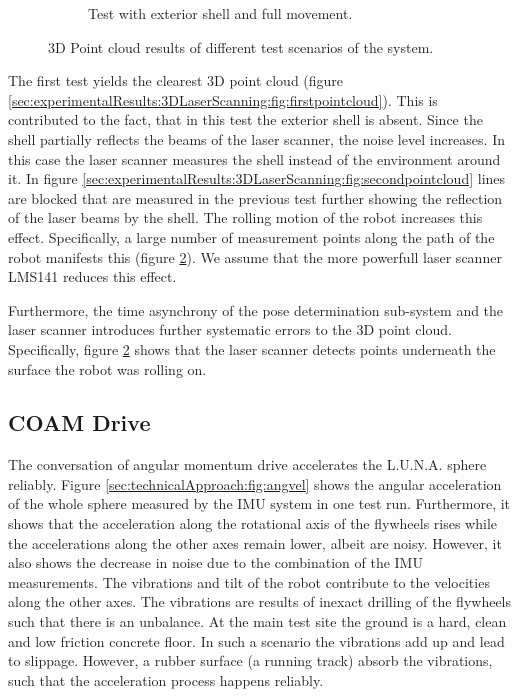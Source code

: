 \begin{figure}
\begin{subfigure}[b]{0.6\textwidth}
	\caption{Test with exterior shell and full movement.}
	\label{sec:experimentalResults:3DLaserScanning:fig:thirdpointcloud}
\end{subfigure}
\caption{3D Point cloud results of different test scenarios of the system.}
\end{figure}

The first test yields the clearest 3D point cloud (figure \ref{sec:experimentalResults:3DLaserScanning:fig:firstpointcloud}).
This is contributed to the fact, that in this test the exterior shell is absent.
Since the shell partially reflects the beams of the laser scanner, the noise level increases.
In this case the laser scanner measures the shell instead of the environment around it.
In figure \ref{sec:experimentalResults:3DLaserScanning:fig:secondpointcloud} lines are blocked that are measured in the previous test further showing the reflection of the laser beams by the shell.
The rolling motion of the robot increases this effect.
Specifically, a large number of measurement points along the path of the robot manifests this (figure \ref{sec:experimentalResults:3DLaserScanning:fig:thirdpointcloud}).
We assume that the more powerfull laser scanner LMS141 reduces this effect. 

Furthermore, the time asynchrony of the pose determination sub-system and the laser scanner introduces further systematic errors to the 3D point cloud.
Specifically, figure \ref{sec:experimentalResults:3DLaserScanning:fig:thirdpointcloud} shows that the laser scanner detects points underneath the surface the robot was rolling on. 

\subsection{COAM Drive}
\label{sec:experimentalResults:COAMDrive}

The conversation of angular momentum drive accelerates the L.U.N.A. sphere reliably.
Figure \ref{sec:technicalApproach:fig:angvel} shows the angular acceleration of the whole sphere measured by the IMU system in one test run. 
Furthermore, it shows that the acceleration along the rotational axis of the flywheels rises while the accelerations along the other axes remain lower, albeit are noisy. 
However, it also shows the decrease in noise due to the combination of the IMU measurements.
The vibrations and tilt of the robot contribute to the velocities along the other axes.
The vibrations are results of inexact drilling of the flywheels such that there is an unbalance.
At the main test site the ground is a hard, clean and low friction concrete floor.
In such a scenario the vibrations add up and lead to slippage.
However, a rubber surface (a running track) absorb the vibrations, such that the acceleration process happens reliably.
